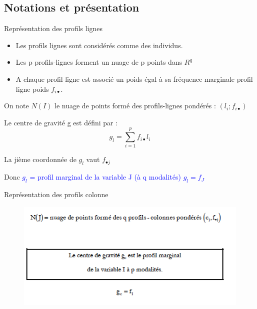 \documentclass[12pt]{beamer}
\begin{document}
\subsection{Notations et présentation}

\begin{frame}{Représentation des profils lignes}
\begin{itemize}
\item Les profils lignes sont considérés comme des individus.\\
\item Les p profils-lignes forment un nuage de p points dans $R^q$\\

\item A chaque profil-ligne est associé un poids égal à sa fréquence marginale profil ligne poids
$f_{i \bullet}$.
\end{itemize}
On note $N(I)$ le nuage de points formé des profils-lignes pondérés :
$( l_i; f_{i \bullet})$

Le centre de gravité g est défini par : $$ g_l=\sum_{i=1}^p f_{i \bullet}l_i$$

La jième coordonnée de $g_l$ vaut $f_{\bullet j}$

Donc \textcolor{blue}{$g_l$ = profil marginal de la variable J (à q modalités) $g_l=f_J$}

\end{frame}
\begin{frame}{Représentation des profils colonne}
\begin{figure}
\includegraphics[scale=0.7]{exemple10.png}  
\end{figure}
\end{frame}
\end{document}
